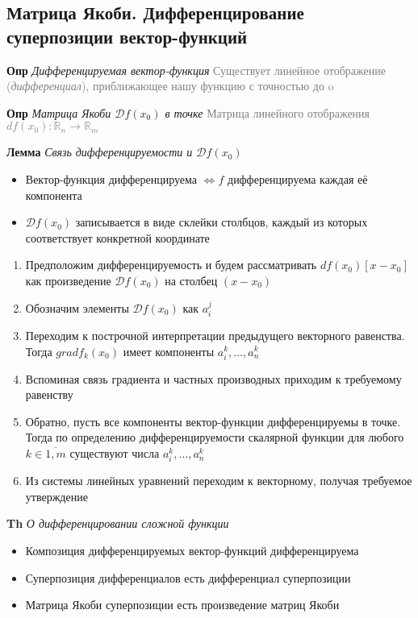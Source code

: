 \subsection{Матрица Якоби. Дифференцирование суперпозиции вектор-функций}

\textbf{Опр} \textit{Дифференцируемая вектор-функция}
\textcolor{gray}{Существует линейное отображение (\textit{дифференциал}), приближающее нашу функцию с точностью до o}

\textbf{Опр} \textit{Матрица Якоби $\mathcal{D} f(x_0)$ в точке}
\textcolor{gray}{Матрица линейного отображения $df(x_0): \mathds{R}_n \rightarrow \mathds{R}_m$}

\textbf{Лемма} \textit{Связь дифференцируемости и $\mathcal{D} f(x_0)$}

\begin{itemize}
    \color{blue}
    \item Вектор-функция дифференцируема $\Leftrightarrow f$ дифференцируема каждая её компонента
    \item $\mathcal{D} f(x_0)$ записывается в виде склейки столбцов, каждый из которых соответствует конкретной координате
\end{itemize}

\begin{enumerate}
    \item Предположим дифференцируемость и будем рассматривать $df(x_0)[x - x_0]$ как произведение $\mathcal{D} f(x_0)$
    на столбец $(x - x_0)$
    \item Обозначим элементы $\mathcal{D} f(x_0)$ как $a_i^j$
    \item Переходим к построчной интерпретации предыдущего векторного равенства.
    Тогда $grad f_k(x_0)$ имеет компоненты $a_i^k, \dots, a_n^k$
    \item Вспоминая связь градиента и частных производных приходим к требуемому равенству
    \item Обратно, пусть   все компоненты вектор-функции дифференцируемы в точке.
    Тогда   по   определению   дифференцируемости   скалярной функции для  любого  $k \in \overline{1, m}$
    существуют числа $a_i^k, \dots, a_n^k$
    \item Из системы линейных уравнений переходим к векторному, получая требуемое утверждение
\end{enumerate}

\textbf{Th} \textit{О дифференцировании сложной функции}

\begin{itemize}
    \color{blue}
    \item Композиция дифференцируемых вектор-функций дифференцируема
    \item Суперпозиция дифференциалов есть дифференциал суперпозиции
    \item Матрица Якоби суперпозиции есть произведение матриц Якоби
\end{itemize}

